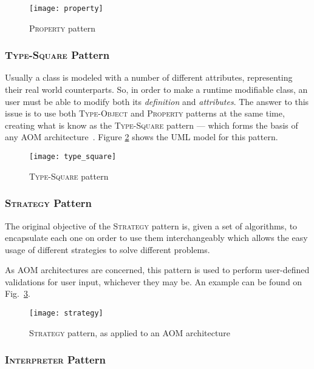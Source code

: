 \begin{figure}[H]
  \centering
  \texttt{[image: property]}
  \caption{\textsc{Property} pattern}
  \label{fig:property_pattern}
\end{figure}

\subsubsection{\textsc{Type-Square} Pattern}\label{sec:type-square_pattern}

Usually a class is modeled with a number of different attributes, representing their real world counterparts. So, in order to make a runtime modifiable class, an user must be able to modify both its \emph{definition} and \emph{attributes}. The answer to this issue is to use both \textsc{Type-Object} and \textsc{Property} patterns at the same time, creating what is know as the \textsc{Type-Square} pattern --- which forms the basis of any AOM architecture~\cite{YJ02}. Figure \ref{fig:type_square} shows the UML model for this pattern.

\begin{figure}[H]
  \centering
  \texttt{[image: type\_square]}
  \caption{\textsc{Type-Square} pattern}
  \label{fig:type_square}
\end{figure}

\subsubsection{\textsc{Strategy} Pattern}\label{sec:strategy_pattern}

The original objective of the \textsc{Strategy} pattern is, given a set of algorithms, to encapsulate each one on order to use them interchangeably which allows the easy usage of different strategies to solve different problems\cite{gang_of_four}.

As AOM architectures are concerned, this pattern is used to perform user-defined validations for user input, whichever they may be. An example can be found on Fig.~\ref{fig:strategy_pattern}.

\begin{figure}[H]
  \centering
  \texttt{[image: strategy]}
  \caption{\textsc{Strategy} pattern, as applied to an AOM architecture}
  \label{fig:strategy_pattern}
\end{figure}

\subsubsection{\textsc{Interpreter} Pattern}\label{sec:interpreter_pattern}

